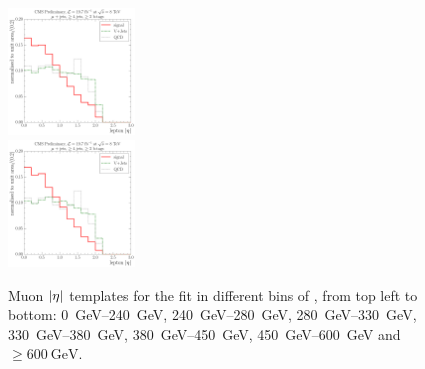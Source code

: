 \begin{figure}[!htbp]
  	{\includegraphics[width=0.3\textwidth]{measurement/HT/central/fit_templates/muon_templates_bin_450-600}}\\
  	{\includegraphics[width=0.3\textwidth]{measurement/HT/central/fit_templates/muon_templates_bin_600-inf}}
    \caption[Muon $\abs \eta$ templates for the fit in different bins of \HT]{Muon $\abs \eta$ templates for the fit in
    different bins of \HT, from top left to bottom: \SIrange{0}{240}{\GeV}, \SIrange{240}{280}{\GeV},
    \SIrange{280}{330}{\GeV}, \SIrange{330}{380}{\GeV}, \SIrange{380}{450}{\GeV}, \SIrange{450}{600}{\GeV} and $\geq
    \SI{600}{\GeV}$.}
    \label{fig:fit_templates_HT_muon}
\end{figure}

\newpage
{}

